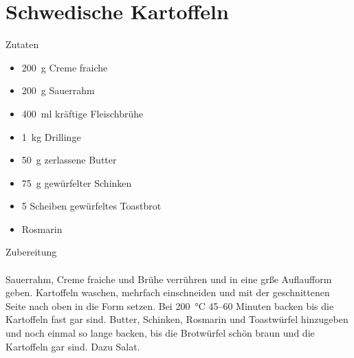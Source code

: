 \section*{Schwedische Kartoffeln}
\ihead{}\ohead{}
\cfoot{}
{\Large Zutaten}
\begin{multicols}{2}
\begin{itemize}
    \item \SI{200}{g} Creme fraiche
    \item \SI{200}{g} Sauerrahm
    \item \SI{400}{ml} kräftige Fleischbrühe
    \item \SI{1}{kg} Drillinge
    \item \SI{50}{g} zerlassene Butter
    \item \SI{75}{g} gewürfelter Schinken
    \item \num{5} Scheiben gewürfeltes Toastbrot
    \item Rosmarin
\end{itemize}
\end{multicols}
\noindent
{\Large Zubereitung}\\
\\
Sauerrahm, Creme fraiche und Brühe verrühren und in eine grße Auflaufform geben.
Kartoffeln waschen, mehrfach einschneiden und mit der geschnittenen Seite nach oben in die Form setzen.
Bei \SI{200}{\celsius} \numrange{45}{60} Minuten backen bis die Kartoffeln fast gar sind.
Butter, Schinken, Rosmarin und Toastwürfel hinzugeben und noch einmal so lange backen, bis die Brotwürfel schön braun und die Kartoffeln gar sind.
Dazu Salat.